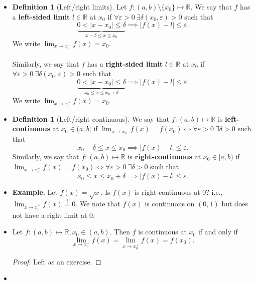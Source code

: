 \documentclass{article}
\newcommand{\R}{\mathbb{R}}
\newcommand{\?}{\stackrel{?}{=}}
\theoremstyle{definition} %
\newtheorem{definition}[subsection]{Definition} %
\begin{document}
\begin{itemize}
\begin{definition}[Continuity on an interval]
        We write $f \in C^0 \big((a, b)\big)$.
    \end{definition}
    \item[]
    \begin{definition}[Left/right limits]
        Let $f: (a, b) \setminus \{x_0\} \mapsto \R$. We say that $f$ has a \textbf{left-sided limit} $l \in \R$ at $x_0$ if $\forall \varepsilon > 0 \ \exists \delta(x_0, \varepsilon) > 0$ such that
        $$\underbrace{0 < |x - x_0| \leq \delta}_{x - \delta \leq x \leq x_0} \implies |f(x) - l| \leq \varepsilon.$$ 
        We write $\lim_{x \to x_0^-} f(x) = x_0$. \\\\
        Similarly, we say that $f$ has a \textbf{right-sided limit} $l \in \R$ at $x_0$ if $\forall \varepsilon > 0 \ \exists \delta(x_0, \varepsilon) > 0$ such that
        $$\underbrace{0 < |x - x_0| \leq \delta}_{x_0 \leq x \leq x_0 + \delta} \implies |f(x) - l| \leq \varepsilon.$$
        We write $\lim_{x \to x_0^+} f(x) = x_0$.
    \end{definition}
    \item[]
    \begin{definition}[Left/right continuous]
        We say that $f: (a, b) \mapsto \R$ is \textbf{left-continuous} at $x_0 \in (a, b]$ if $\lim_{x \to x_0^-} f(x) = f(x_0) \iff \forall \varepsilon > 0 \ \exists \delta > 0$ such that
        $$x_0 - \delta \leq x \leq x_0 \implies |f(x) - l| \leq \varepsilon.$$
        Similarly, we say that $f: (a, b) \mapsto \R$ is \textbf{right-continuous} at $x_0 \in [a, b)$ if $\lim_{x \to x_0^+} f(x) = f(x_0) \iff \forall \varepsilon > 0 \ \exists \delta > 0$ such that
        $$x_0 \leq x \leq x_0 + \delta \implies |f(x) - l| \leq \varepsilon.$$
    \end{definition}
    \item \textbf{Example}. Let $f(x) = \sqrt{x}$. Is $f(x)$ is right-continuous at 0? i.e., $\lim_{x \to x_0^+} f(x) \overset{?}{=} 0$. We note that $f(x)$ is continuous on $(0, 1)$ but does not have a right limit at 0.
    \item[]
    \begin{lemma}
        Let $f: (a, b) \mapsto \R, x_0 \in (a, b)$. Then $f$ is continuous at $x_0$ if and only if
        $$\lim_{x \to x_0^-} f(x) = \lim_{x \to x_0^+} f(x) = f(x_0).$$
    \end{lemma}
    \begin{proof}
        Left as an exercise.
    \end{proof}
    \item[]

\end{itemize}
\end{document}
